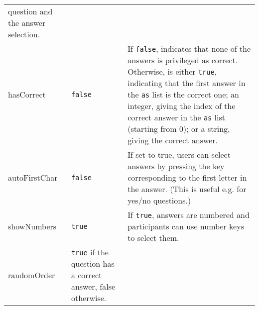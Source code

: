 \documentclass[
]{article}
\begin{document}
\begin{RaggedRight}
\begin{longtable}[]{p{1.7in}p{1in}p{3.15in}}
\begin{minipage}[t]{0.61\columnwidth}
question and the answer selection.\strut
\end{minipage}\tabularnewline
\begin{minipage}[t]{0.16\columnwidth}\raggedright
hasCorrect\strut
\end{minipage} & \begin{minipage}[t]{0.14\columnwidth}\raggedright
\texttt{false}\strut
\end{minipage} & \begin{minipage}[t]{0.61\columnwidth}\raggedright
If \texttt{false}, indicates that none of the answers is privileged as
correct. Otherwise, is either \texttt{true}, indicating that the first
answer in the \texttt{as} list is the correct one; an integer, giving
the index of the correct answer in the \texttt{as} list (starting from
0); or a string, giving the correct answer.\strut
\end{minipage}\tabularnewline
\begin{minipage}[t]{0.16\columnwidth}\raggedright
autoFirstChar\strut
\end{minipage} & \begin{minipage}[t]{0.14\columnwidth}\raggedright
\texttt{false}\strut
\end{minipage} & \begin{minipage}[t]{0.61\columnwidth}\raggedright
If set to true, users can select answers by pressing the key
corresponding to the first letter in the answer. (This is useful e.g.
for yes/no questions.)\strut
\end{minipage}\tabularnewline
\begin{minipage}[t]{0.16\columnwidth}\raggedright
showNumbers\strut
\end{minipage} & \begin{minipage}[t]{0.14\columnwidth}\raggedright
\texttt{true}\strut
\end{minipage} & \begin{minipage}[t]{0.61\columnwidth}\raggedright
If \texttt{true}, answers are numbered and participants can use number
keys to select them.\strut
\end{minipage}\tabularnewline
\begin{minipage}[t]{0.16\columnwidth}\raggedright
randomOrder\strut
\end{minipage} & \begin{minipage}[t]{0.14\columnwidth}\raggedright
\texttt{true} if the question has a correct answer, false
otherwise.\strut
\end{minipage} & \begin{minipage}[t]{0.61\columnwidth}\raggedright

\end{minipage}
\end{longtable}
\end{RaggedRight}
\end{document}
